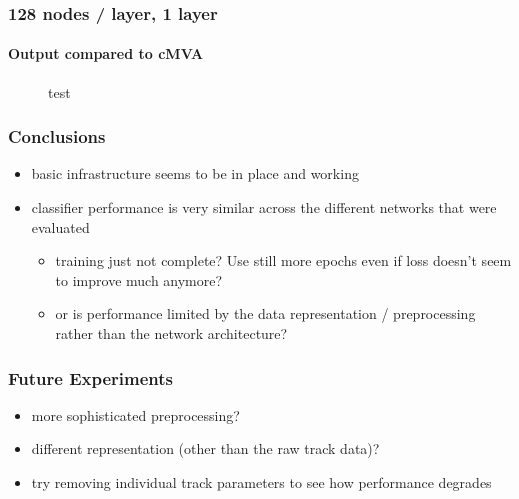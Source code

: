 \documentclass{beamer}
\begin{document}
\begin{frame}
  \frametitle{128 nodes / layer, 1 layer}
  \framesubtitle{Output compared to cMVA}
  \begin{figure}[htb]
    \centering

    \caption{test}
  \end{figure}
\end{frame}


\begin{frame}
  \frametitle{Conclusions}
  \begin{itemize}
  \item basic infrastructure seems to be in place and working
  \item classifier performance is very similar across the different networks that were evaluated
    \begin{itemize}
      \item training just not complete? Use still more epochs even if loss doesn't seem to improve much anymore?
      \item or is performance limited by the data representation / preprocessing rather than the network architecture?
    \end{itemize}
  \end{itemize}
\end{frame}

\begin{frame}
  \frametitle{Future Experiments}

  \begin{itemize}
  \item more sophisticated preprocessing?
  \item different representation (other than the raw track data)?
  \item try removing individual track parameters to see how performance degrades
  \end{itemize}
  
\end{frame}
\end{document}
